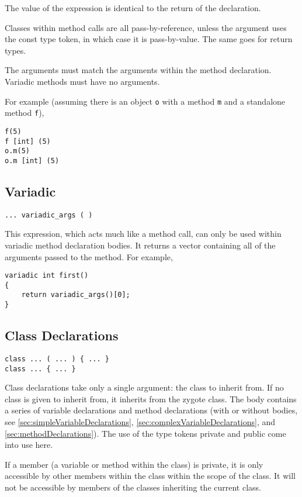 \documentclass[10pt,a4paper]{article}
\begin{document}
The value of the expression is identical to the return of the declaration.

Classes within method calls are all pass-by-reference, unless the argument uses the const type token, in which case it is pass-by-value. The same goes for return types. 

The arguments must match the arguments within the method declaration. Variadic methods must have no arguments.

For example (assuming there is an object \verb|o| with a method \verb|m| and a standalone method \verb|f|),
\begin{verbatim}
f(5)
f [int] (5)
o.m(5)
o.m [int] (5)
\end{verbatim}

\subsection{Variadic}
\label{sec:variadic}
\begin{verbatim}
... variadic_args ( )
\end{verbatim}

This expression, which acts much like a method call, can only be used within variadic method declaration bodies. It returns a vector containing all of the arguments passed to the method. For example,
\begin{verbatim}
variadic int first()
{
    return variadic_args()[0];
}
\end{verbatim}

\subsection{Class Declarations}
\begin{verbatim}
class ... ( ... ) { ... }
class ... { ... }
\end{verbatim}

Class declarations take only a single argument: the class to inherit from. If no class is given to inherit from, it inherits from the zygote class. The body contains a series of variable declarations and method declarations (with or without bodies, see \ref{sec:simpleVariableDeclarations}, \ref{sec:complexVariableDeclarations}, and \ref{sec:methodDeclarations}). The use of the type tokens private and public come into use here.

If a member (a variable or method within the class) is private, it is only accessible by other members within the class within the scope of the class. It will not be accessible by members of the classes inheriting the current class.
\end{document}
